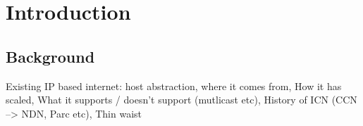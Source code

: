 \chapter{Introduction}
\cite{nfd-dev-guide}
\section{Background}
Existing IP based internet: host abstraction, where it comes from, How it has scaled, What it supports / doesn't support (mutlicast etc), History of ICN (CCN --> NDN, Parc etc), Thin waist